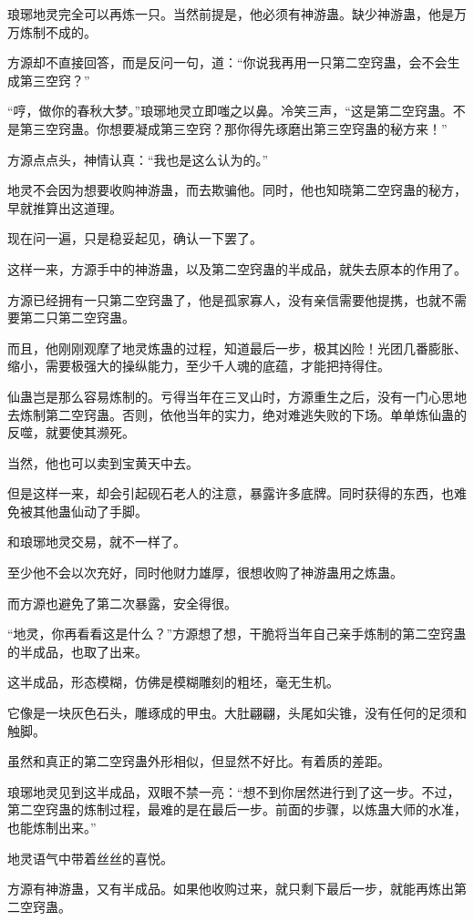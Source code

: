 \begin{this_body}
琅琊地灵完全可以再炼一只。当然前提是，他必须有神游蛊。缺少神游蛊，他是万万炼制不成的。

方源却不直接回答，而是反问一句，道：“你说我再用一只第二空窍蛊，会不会生成第三空窍？”

“哼，做你的春秋大梦。”琅琊地灵立即嗤之以鼻。冷笑三声，“这是第二空窍蛊。不是第三空窍蛊。你想要凝成第三空窍？那你得先琢磨出第三空窍蛊的秘方来！”

方源点点头，神情认真：“我也是这么认为的。”

地灵不会因为想要收购神游蛊，而去欺骗他。同时，他也知晓第二空窍蛊的秘方，早就推算出这道理。

现在问一遍，只是稳妥起见，确认一下罢了。

这样一来，方源手中的神游蛊，以及第二空窍蛊的半成品，就失去原本的作用了。

方源已经拥有一只第二空窍蛊了，他是孤家寡人，没有亲信需要他提携，也就不需要第二只第二空窍蛊。

而且，他刚刚观摩了地灵炼蛊的过程，知道最后一步，极其凶险！光团几番膨胀、缩小，需要极强大的操纵能力，至少千人魂的底蕴，才能把持得住。

仙蛊岂是那么容易炼制的。亏得当年在三叉山时，方源重生之后，没有一门心思地去炼制第二空窍蛊。否则，依他当年的实力，绝对难逃失败的下场。单单炼仙蛊的反噬，就要使其濒死。

当然，他也可以卖到宝黄天中去。

但是这样一来，却会引起砚石老人的注意，暴露许多底牌。同时获得的东西，也难免被其他蛊仙动了手脚。

和琅琊地灵交易，就不一样了。

至少他不会以次充好，同时他财力雄厚，很想收购了神游蛊用之炼蛊。

而方源也避免了第二次暴露，安全得很。

“地灵，你再看看这是什么？”方源想了想，干脆将当年自己亲手炼制的第二空窍蛊的半成品，也取了出来。

这半成品，形态模糊，仿佛是模糊雕刻的粗坯，毫无生机。

它像是一块灰色石头，雕琢成的甲虫。大肚翩翩，头尾如尖锥，没有任何的足须和触脚。

虽然和真正的第二空窍蛊外形相似，但显然不好比。有着质的差距。

琅琊地灵见到这半成品，双眼不禁一亮：“想不到你居然进行到了这一步。不过，第二空窍蛊的炼制过程，最难的是在最后一步。前面的步骤，以炼蛊大师的水准，也能炼制出来。”

地灵语气中带着丝丝的喜悦。

方源有神游蛊，又有半成品。如果他收购过来，就只剩下最后一步，就能再炼出第二空窍蛊。


\end{this_body}
